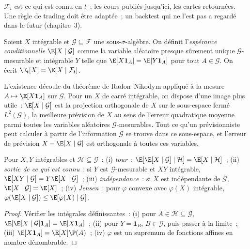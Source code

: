 $\mathcal F_t$ est ce qui est connu en $t$~: les cours publiés jusqu'ici, les cartes retournées. Une
règle de trading doit être adaptée~; un backtest qui ne l'est pas a regardé dans le futur (chapitre~3).

\begin{definition}\label{def:qm:probability-at-speed:condexp}
Soient $X$ intégrable et $\mathcal G \subseteq \mathcal F$ une sous-$\sigma$-algèbre. On définit
l'\emph{espérance conditionnelle} $\E[X \mid \mathcal G]$ comme
la variable aléatoire presque sûrement unique $\mathcal G$-mesurable et intégrable $Y$ telle que
$\E[X\mathbf 1_A] = \E[Y\mathbf 1_A]$ pour tout $A \in \mathcal G$. On écrit $\E_t[X] =
\E[X \mid \mathcal F_t]$.
\end{definition}

L'existence découle du théorème de Radon--Nikodym appliqué à la mesure $A \mapsto \E[X\mathbf
1_A]$ sur $\mathcal G$. Pour un $X$ de carré intégrable, on dispose d'une image plus utile~:
$\E[X \mid \mathcal G]$ est la projection orthogonale de $X$ sur le sous-espace fermé
$L^2(\mathcal G)$, la meilleure prévision de $X$ au sens de l'erreur quadratique moyenne parmi toutes les variables aléatoires $\mathcal
G$-mesurables. Tout ce qu'un prévisionniste peut calculer à partir de l'information
$\mathcal G$ se trouve dans ce sous-espace, et l'erreur de prévision $X - \E[X \mid \mathcal G]$ est
orthogonale à toutes ces variables.

\begin{proposition}\label{prop:qm:probability-at-speed:rules}
Pour $X, Y$ intégrables et $\mathcal H \subseteq \mathcal G$~:
(i) \emph{tour}~: $\E[\E[X \mid \mathcal G] \mid \mathcal H] = \E[X \mid \mathcal H]$~;
(ii) \emph{sortie de ce qui est connu}~: si $Y$ est $\mathcal G$-mesurable et $XY$ intégrable,
$\E[XY \mid \mathcal G] = Y\E[X \mid \mathcal G]$~;
(iii) \emph{indépendance}~: si $X$ est indépendante de $\mathcal G$, $\E[X \mid \mathcal G] =
\E[X]$~;
(iv) \emph{Jensen}~: pour $\varphi$ convexe avec $\varphi(X)$ intégrable, $\varphi(\E[X \mid
\mathcal G]) \le \E[\varphi(X) \mid \mathcal G]$.
\end{proposition}

\begin{proof}
Vérifier les intégrales définissantes~: (i) pour $A \in \mathcal H \subseteq \mathcal G$, $\E[\E[X \mid
\mathcal G]\mathbf 1_A] = \E[X\mathbf 1_A]$~; (ii) pour $Y = \mathbf 1_B$, $B \in \mathcal G$,
puis passer à la limite~; (iii) $\E[X\mathbf 1_A] = \E[X]\P(A)$~; (iv) $\varphi$ est un supremum de
fonctions affines en nombre dénombrable.
\end{proof}

